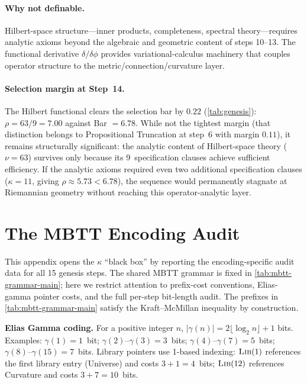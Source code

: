 \documentclass[11pt,a4paper]{article}
\theoremstyle{plain}
\theoremstyle{definition}
\theoremstyle{remark}
\begin{document}
\paragraph{Why not definable.}
Hilbert-space structure---inner products, completeness, spectral theory---requires analytic axioms beyond the algebraic and geometric content of steps 10--13.
The functional derivative $\delta/\delta\phi$ provides variational-calculus machinery that couples operator structure to the metric/connection/curvature layer.

\paragraph{Selection margin at Step~14.}
The Hilbert functional clears the selection bar by $0.22$ (\cref{tab:genesis}): $\rho = 63/9 = 7.00$ against Bar $= 6.78$.
While not the tightest margin (that distinction belongs to Propositional Truncation at step~6 with margin $0.11$), it remains structurally significant: the analytic content of Hilbert-space theory ($\nu = 63$) survives only because its 9~specification clauses achieve sufficient efficiency.
If the analytic axioms required even two additional specification clauses ($\kappa = 11$, giving $\rho \approx 5.73 < 6.78$), the sequence would permanently stagnate at Riemannian geometry without reaching this operator-analytic layer.

\section{The MBTT Encoding Audit}
\label{sec:mbtt-audit}

This appendix opens the $\kappa$ ``black box'' by reporting the encoding-specific audit data for all 15 genesis steps.
The shared MBTT grammar is fixed in \cref{tab:mbtt-grammar-main}; here we restrict attention to prefix-cost conventions, Elias-gamma pointer costs, and the full per-step bit-length audit.
The prefixes in \cref{tab:mbtt-grammar-main} satisfy the Kraft--McMillan inequality by construction.

\noindent\textbf{Elias Gamma coding.}
For a positive integer $n$, $|\gamma(n)| = 2\lfloor \log_2 n \rfloor + 1$ bits.
Examples: $\gamma(1) = 1$~bit; $\gamma(2)\text{--}\gamma(3) = 3$~bits; $\gamma(4)\text{--}\gamma(7) = 5$~bits; $\gamma(8)\text{--}\gamma(15) = 7$~bits.
Library pointers use 1-based indexing: $\textsc{Lib}(1)$ references the first library entry (Universe) and costs $3 + 1 = 4$~bits; $\textsc{Lib}(12)$ references Curvature and costs $3 + 7 = 10$~bits.
\end{document}
